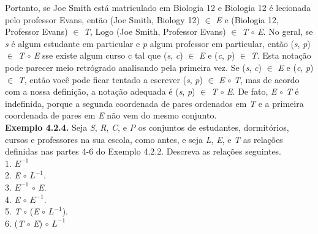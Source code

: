 Portanto, se Joe Smith está matriculado em Biologia 12 e Biologia 12 é lecionada pelo professor Evans, então (Joe Smith, Biology 12) $\in$ \textit{E} e (Biologia 12, Professor Evans) $\in$ \textit{T}, Logo (Joe Smith, Professor Evans) $\in$ \textit{T} $\circ$ \textit{E}. No geral, se \textit{s} é algum estudante em particular e \textit{p} algum professor em particular, então (\textit{s}, \textit{p}) $\in$ \textit{T} $\circ$ \textit{E} sse existe algum curso c tal que (\textit{s}, \textit{c}) $\in$ \textit{E} e (\textit{c}, \textit{p}) $\in$ \textit{T}. Esta notação pode parecer meio retrógrado analisando pela primeira vez. Se (\textit{s}, \textit{c}) $\in$ \textit{E} e (\textit{c}, \textit{p}) $\in$ \textit{T}, então você pode ficar tentado a escrever (\textit{s}, \textit{p}) $\in$ \textit{E} $\circ$ \textit{T}, mas de acordo com a nossa definição, a notação adequada é (\textit{s}, \textit{p}) $\in$ \textit{T} $\circ$ \textit{E}. De fato, \textit{E} $\circ$ \textit{T} é indefinida, porque a segunda coordenada de pares ordenados em \textit{T} e a primeira coordenada de pares em \textit{E} não vem do mesmo conjunto.   
\\

\textbf{Exemplo 4.2.4.} Seja \textit{S}, \textit{R}, \textit{C}, e \textit{P} os conjuntos de estudantes, dormitórios, cursos e professores na sua escola, como antes, e seja \textit{L}, \textit{E}, e \textit{T} as relações definidas nas partes 4-6 do Exemplo 4.2.2. Descreva as relações seguintes.
\\
1. $\textit{E}^{-1}$
\\
2. \textit{E} $\circ$ $\textit{L}^{-1}$.
\\
3. $\textit{E}^{-1}$ $\circ$ \textit{E}.
\\
4. \textit{E} $\circ$ $\textit{E}^{-1}$.
\\
5. \textit{T} $\circ$ (\textit{E} $\circ$ $\textit{L}^{-1}$).
\\
6. (\textit{T} $\circ$ \textit{E}) $\circ$ $\textit{L}^{-1}$
\\

